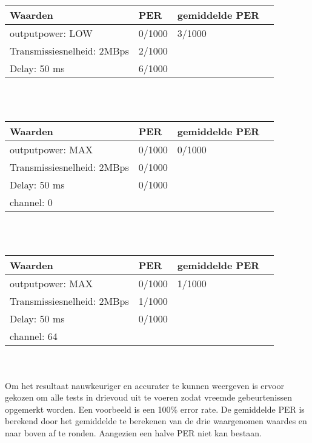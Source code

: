 \documentclass{article}
\begin{document}
    \begin{tabular}{ | l | l | l | p{5cm} |}
    \hline
    Waarden 					& PER 		& gemiddelde PER\\ \hline
    outputpower: LOW 			& 0/1000 	& 3/1000		\\ \hline
    Transmissiesnelheid: 2MBps 	& 2/1000 	&   			\\ \hline
    Delay: 50 ms 				& 6/1000 	&  				\\ \hline
    \end{tabular}\\
    \\
    
    \begin{tabular}{ | l | l | l | p{5cm} |}
    \hline
    Waarden 					& PER 		& gemiddelde PER\\ \hline
    outputpower: MAX 			& 0/1000 	&  0/1000		\\ \hline
    Transmissiesnelheid: 2MBps 	& 0/1000 	&   			\\ \hline
    Delay: 50 ms 				& 0/1000 	&				\\ \hline
    channel: 0 					&  			&  				\\ \hline
    \end{tabular}\\
    \\
    
    \begin{tabular}{ | l | l | l | p{5cm} |}
    \hline
    Waarden 					& PER 		& gemiddelde PER\\ \hline
    outputpower: MAX 			& 0/1000 	& 1/1000		\\ \hline
    Transmissiesnelheid: 2MBps 	& 1/1000 	&  				\\ \hline
    Delay: 50 ms 				& 0/1000 	&  				\\ \hline
    channel: 64 				&  			&				\\ \hline
    \end{tabular}\\
    \\

Om het resultaat nauwkeuriger en accurater te kunnen weergeven is ervoor gekozen om alle tests in drievoud uit te voeren zodat vreemde gebeurtenissen opgemerkt worden. Een voorbeeld is een 100\% error rate.
\newline 
De gemiddelde PER is berekend door het gemiddelde te berekenen van de drie waargenomen waardes en naar boven af te ronden. Aangezien een halve PER niet kan bestaan. 
\end{document}
